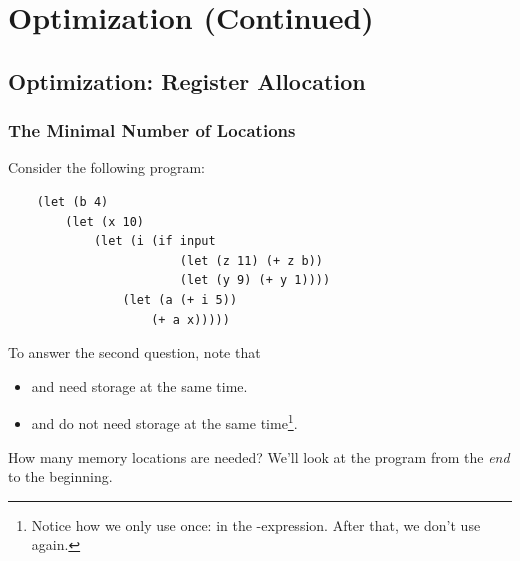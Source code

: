 \documentclass[letterpaper]{article}
\begin{document}
\section{Optimization (Continued)}
\subsection{Optimization: Register Allocation}
\subsubsection{The Minimal Number of Locations}
Consider the following program: 
\begin{verbatim}
    (let (b 4)
        (let (x 10)
            (let (i (if input 
                        (let (z 11) (+ z b))
                        (let (y 9) (+ y 1))))
                (let (a (+ i 5))
                    (+ a x)))))\end{verbatim}
To answer the second question, note that 
\begin{itemize}
    \item {} and  need storage at the same time.
    \item {} and  do not need storage at the same time\footnote{Notice how we only use  once: in the -expression. After that, we don't use  again.}. 
\end{itemize}
How many memory locations are needed? We'll look at the program from the \emph{end} to the beginning.
\end{document}

